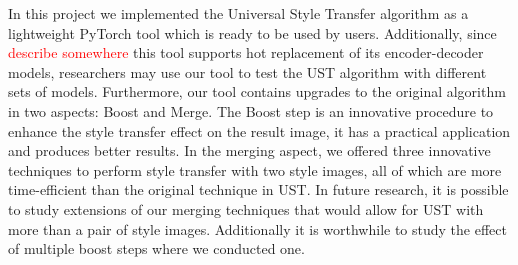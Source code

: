 In this project we implemented the Universal Style Transfer algorithm as a lightweight PyTorch tool which is ready to be used by users. Additionally, since \textcolor{red}{describe somewhere} this tool supports hot replacement of its encoder-decoder models, researchers may use our tool to test the UST algorithm with different sets of models. Furthermore, our tool contains upgrades to the original algorithm in two aspects: Boost and Merge. The Boost step is an innovative procedure to enhance the style transfer effect on the result image, it has a practical application and produces better results. In the merging aspect, we offered three innovative techniques to perform style transfer with two style images, all of which are more time-efficient than the original technique in UST. In future research, it is possible to study extensions of our merging techniques that would allow for UST with more than a pair of style images. Additionally it is worthwhile to study the effect of multiple boost steps where we conducted one.



